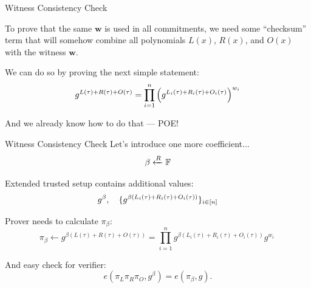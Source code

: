 \documentclass{zkdl-presentation-template}
\begin{document}
    \begin{frame}{Witness Consistency Check}
        
        To prove that the same $\mathbf{w}$ is used in all commitments, we need some ``checksum''
        term that will somehow combine all polynomials $L(x)$, $R(x)$, and $O(x)$ with the witness
        $\mathbf{w}$.

        
        We can do so by proving the next simple statement:
        \vspace{-5pt}
        \begin{equation*}
            g^{L(\tau) + R(\tau) + O(\tau)} =  \prod_{i=1}^n {\left(g^{L_i(\tau) + R_i(\tau) + O_i(\tau)}\right)}^{w_i}
            \vspace{-5pt}
        \end{equation*}
        
        And we already know how to do that --- POE!
    \end{frame}

    \begin{frame}{Witness Consistency Check}
        Let's introduce one more coefficient...
        \vspace{-5pt}
        \begin{equation*}
            \beta \xleftarrow{R} \mathbb{F}
            \vspace{-5pt}
        \end{equation*}
        
        Extended trusted setup contains additional values:
        \vspace{-5pt}
        \begin{equation*}
            g^{\beta}, \quad \{g^{\beta(L_i(\tau) + R_i(\tau) + O_i(\tau))}\}_{i \in \left[ n \right]}
            \vspace{-5pt}
        \end{equation*}
        
        Prover needs to calculate $\pi_{\beta}$:
        \vspace{-5pt}
        \begin{equation*}
            \pi_{\beta} \gets g^{\beta(L(\tau) + R(\tau) + O(\tau))} =  \prod_{i=1}^{n} g^{\beta(L_i(\tau) + R_i(\tau) + O_i(\tau))}g^{w_i}\
        \end{equation*}
        
        And easy check for verifier:
        \vspace{-5pt}
        \begin{equation*}
            e(\pi_L\pi_R\pi_O, g^{\beta}) = e(\pi_{\beta}, g).
        \end{equation*}
    \end{frame}
\end{document}
